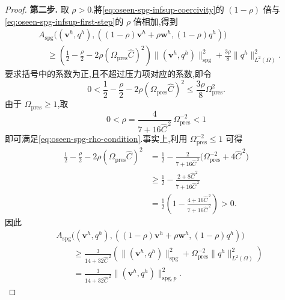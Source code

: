 \begin{proof}
\noindent\textbf{第二步.} 取 $\rho>0$.將\cref{eq:oseen-spg-infsup-coercivity}的 $(1-\rho)$ 倍与\cref{eq:oseen-spg-infsup-first-step}的 $\rho$ 倍相加,得到
\begin{equation*}
\begin{aligned}
 &A_{\mathrm{spg}}\bigl((\bm{v}^h,q^h),
       ((1-\rho)\bm{v}^h+\rho\bm{w}^h,(1-\rho)q^h)\bigr)\\
 &\quad\ge
   \left(\frac12-\frac{\rho}{2}
        -2\rho(\Omega_{\mathrm{pres}}\widehat C)^2\right)
       \|(\bm{v}^h,q^h)\|_{\mathrm{spg}}^2
       +\frac{3\rho}{8}\|q^h\|_{L^2(\Omega)}^2.
\end{aligned}
\end{equation*}
要求括号中的系数为正,且不超过压力项对应的系数,即令
\begin{equation}\label{eq:oseen-spg-rho-condition}
 0<\frac12-\frac{\rho}{2}
        -2\rho(\Omega_{\mathrm{pres}}\widehat C)^2
       \le\frac{3\rho}{8}\Omega_{\mathrm{pres}}^2.
\end{equation}
由于 $\Omega_{\mathrm{pres}}\ge1$,取
\begin{equation}\label{eq:oseen-spg-rho-choice}
 0<\rho=\frac{4}{7+16\widehat C^{\,2}}\,
              \Omega_{\mathrm{pres}}^{-2}<1
\end{equation}
即可满足\cref{eq:oseen-spg-rho-condition}.事实上,利用
$\Omega_{\mathrm{pres}}^{-2}\le1$ 可得
\begin{equation*}
\begin{aligned}
 \frac12-\frac{\rho}{2}
       -2\rho(\Omega_{\mathrm{pres}}\widehat C)^2
 &=\frac12-\frac{2}{7+16\widehat C^{\,2}}
       \bigl(\Omega_{\mathrm{pres}}^{-2}+4\widehat C^{\,2}\bigr)\\
 &\ge\frac12-\frac{2+8\widehat C^{\,2}}{7+16\widehat C^{\,2}}\\
 &=\frac12\left(1-\frac{4+16\widehat C^{\,2}}
                            {7+16\widehat C^{\,2}}\right)>0.
\end{aligned}
\end{equation*}
因此
\begin{equation}\label{eq:oseen-spg-infsup-pressure-norm-bound}
\begin{aligned}
 &A_{\mathrm{spg}}\bigl((\bm{v}^h,q^h),
       ((1-\rho)\bm{v}^h+\rho\bm{w}^h,(1-\rho)q^h)\bigr)\\
 &\qquad\ge\frac{3}{14+32\widehat C^{\,2}}
       \left(\|(\bm{v}^h,q^h)\|_{\mathrm{spg}}^2
        +\Omega_{\mathrm{pres}}^{-2}\|q^h\|_{L^2(\Omega)}^2\right)\\
 &\qquad=\frac{3}{14+32\widehat C^{\,2}}
       \|(\bm{v}^h,q^h)\|_{\mathrm{spg},p}^2.
\end{aligned}
\end{equation}


\end{proof}
